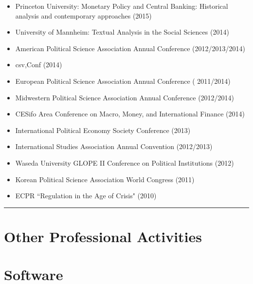 \documentclass[a4paper]{article}
\begin{document}
{{\begin{itemize}
    \item Princeton University: Monetary Policy and Central Banking: Historical analysis and contemporary approaches (2015)
    \item University of Mannheim: Textual Analysis in the Social Sciences (2014)
    \item American Political Science Association Annual Conference (2012/2013/2014)
    \item csv,Conf (2014)
    \item European Political Science Association Annual Conference ( 2011/2014)
    \item Midwestern Political Science Association Annual Conference (2012/2014)
    \item CESifo Area Conference on Macro, Money, and International Finance (2014)
    \item International Political Economy Society Conference (2013)
    \item International Studies Association Annual Convention (2012/2013)
    \item Waseda University GLOPE II Conference on Political Institutions (2012)
    \item Korean Political Science Association World Congress (2011)
    \item ECPR ``Regulation in the Age of Crisis" (2010)
\end{itemize}


\vspace{0.25cm}
\medskip\hrule height 1pt
\vspace{0.5cm}

\section*{Other Professional Activities}

\section*{Software}

}}
\end{document}
